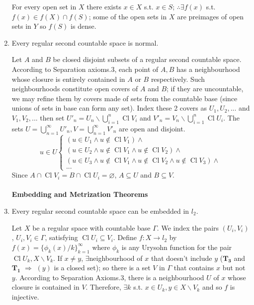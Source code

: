 \documentclass{article}
\DeclareMathOperator{\Cl}{Cl}
\begin{document}
\begin{enumerate}
For every open set in \(X\) there exists \(x\in X\) s.t. \(x\in S\); \(\therefore\exists f(x)\) s.t. \(f(x)\in f(X)\cap f(S)\); some of the open sets in \(X\) are preimages of open sets in \(Y\) so \(f(S)\) is dense.
\item Every regular second countable space is normal.

Let \(A\) and \(B\) be closed disjoint subsets of a regular second countable space. According to \color{gray}Separation axioms.3\color{black}, each point of \(A,B\) has a neighbourhood whose closure is entirely contained in \(A\) or \(B\) respectively. Such neighbourhoods constitute open covers of \(A\) and \(B\); 
if they are uncountable, we may refine them by covers made of sets from the countable base (since unions of sets in base can form any set). Index these 2 covers as \(U_{1},U_{2},...\) and \(V_{1},V_{2},...\) then set \(U'_{n}=U_{n}\backslash\bigcup_{i=1}^{n}\Cl V_{i}\) and \(V'_{n}=V_{n}\backslash\bigcup_{i=1}^{n}\Cl U_{i}\).
The sets \(U=\bigcup_{n=1}^{\infty}U'_{n},V=\bigcup_{n=1}^{\infty}V'_{n}\) are open and disjoint.
\[u\in U\begin{cases}(u\in U_{1}\land u\notin \Cl V_{1})\land\\(u\in U_{2}\land u\notin \Cl V_{1}\land u\notin \Cl V_{2})\land\\(u\in U_{3}\land u\notin \Cl V_{1}\land u\notin \Cl V_{2}\land u\notin \Cl V_{3})\land\\...\end{cases}\]
Since \(A\cap \Cl V_{i}=B\cap \Cl U_{i}=\varnothing\), \(A\subseteq U\) and \(B\subseteq V\).
\\\\
\textbf{Embedding and Metrization Theorems}
\item Every regular second countable space can be embedded in \(l_{2}\).

Let \(X\) be a regular space with countable base \(\Gamma\). We index the pairs \((U_{i},V_{i})\), \(U_{i},V_{i}\in\Gamma\), satisfying \(\Cl U_{i}\subseteq V_{i}\). 
Define \(f:X\to l_{2}\) by \(f(x)=\{\phi_{k}(x)/k\}_{k=1}^{\infty}\) where \(\phi_{k}\) is any Urysohn function for the pair \(\Cl U_{k},X\backslash V_{k}\). 
If \(x\neq y\), \(\exists\)neighbourhood of \(x\) that doesn't include \(y\) (\(\mathbf{T_{3}}\) and \(\mathbf{T_{1}}\) \(\Longrightarrow\) \((y)\) is a closed set);
so there is a set \(V\) in \(\Gamma\) that contains \(x\) but not \(y\). According to \color{gray}Separation Axioms.3\color{black}, there is a neighbourhood \(U\) of \(x\) whose closure is contained in \(V\).
Therefore, \(\exists k\) s.t. \(x\in U_{k}, y\in X\backslash V_{k}\) and so \(f\) is injective.


\end{enumerate}
\end{document}
